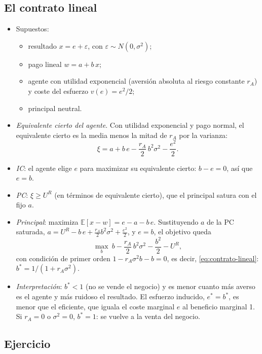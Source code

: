 \documentclass[11pt]{article}
\begin{document}
\subsection{El contrato lineal}\label{anexo:pa-lineal}

\begin{itemize}
\item Supuestos\nocite{HolmstromMilgrom1987Aggregation}:
  \begin{itemize}
  \item resultado $x=e+\varepsilon$, con $\varepsilon\sim N(0,\sigma^2)$;
  \item pago lineal $w=a+b\,x$;
  \item agente con utilidad exponencial (aversión absoluta al riesgo constante $r_A$) y coste del esfuerzo $v(e)=e^2/2$;
  \item principal neutral.
  \end{itemize}
\item \emph{Equivalente cierto del agente}. Con utilidad exponencial y pago normal, el equivalente cierto es la media menos la mitad de $r_A$ por la varianza:
  \begin{equation}
  \xi=a+b\,e-\frac{r_A}{2}\,b^2\sigma^2-\frac{e^2}{2}.
  \end{equation}
\item \emph{IC}: el agente elige $e$ para maximizar su equivalente cierto: $b-e=0$, así que $e=b$.
\item \emph{PC}: $\xi\geq U^R$ (en términos de equivalente cierto), que el principal satura con el fijo $a$.
\item \emph{Principal}: maximiza $\mathbb{E}[x-w]=e-a-b\,e$. Sustituyendo $a$ de la PC saturada, $a=U^R-b\,e+\frac{r_A}{2}b^2\sigma^2+\frac{e^2}{2}$, y $e=b$, el objetivo queda
  \begin{equation}
  \max_{b}\ b-\frac{r_A}{2}\,b^2\sigma^2-\frac{b^2}{2}-U^R ,
  \end{equation}
  con condición de primer orden $1-r_A\sigma^2b-b=0$, es decir, \eqref{eq:contrato-lineal}: $b^*=1/(1+r_A\sigma^2)$.
\item \emph{Interpretación}: $b^*<1$ (no se vende el negocio) y es menor cuanto más averso es el agente y más ruidoso el resultado. El esfuerzo inducido, $e^*=b^*$, es menor que el eficiente, que iguala el coste marginal $e$ al beneficio marginal 1. Si $r_A=0$ o $\sigma^2=0$, $b^*=1$: se vuelve a la venta del negocio.
\end{itemize}
\findemo

\subsection{Ejercicio}\label{anexo:pa-ejercicio}
\end{document}
